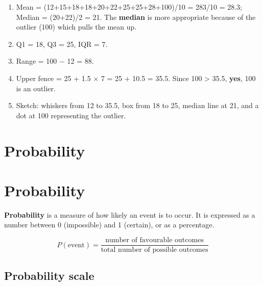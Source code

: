 \documentclass[
  11pt,
  a4paper,
  oneside,
  open=any]{scrbook}
\providecommand{\tightlist}{%
  \setlength{\itemsep}{0pt}\setlength{\parskip}{0pt}}
\begin{document}
\begin{tcolorbox}[enhanced jigsaw, breakable, leftrule=.75mm, bottomtitle=1mm, bottomrule=.15mm, titlerule=0mm, left=2mm, opacitybacktitle=0.6, coltitle=black, colbacktitle=quarto-callout-note-color!10!white, rightrule=.15mm, title=\textcolor{quarto-callout-note-color}{\faInfo}\hspace{0.5em}{Answers}, toptitle=1mm, arc=.35mm, colback=white, toprule=.15mm, colframe=quarto-callout-note-color-frame, opacityback=0]

\begin{enumerate}
\def\labelenumi{\arabic{enumi}.}
\tightlist
\item
  Mean = (12+15+18+18+20+22+25+25+28+100)/10 = 283/10 = 28.3; Median =
  (20+22)/2 = 21. The \textbf{median} is more appropriate because of the
  outlier (100) which pulls the mean up.
\item
  Q1 = 18, Q3 = 25, IQR = 7.
\item
  Range = 100 − 12 = 88.
\item
  Upper fence = 25 + 1.5 × 7 = 25 + 10.5 = 35.5. Since 100
  \textgreater{} 35.5, \textbf{yes}, 100 is an outlier.
\item
  Sketch: whiskers from 12 to 35.5, box from 18 to 25, median line at
  21, and a dot at 100 representing the outlier.
\end{enumerate}

\end{tcolorbox}


\chapter{Probability}\label{probability}


\chapter{Probability}\label{sec-probability}

\textbf{Probability} is a measure of how likely an event is to occur. It
is expressed as a number between 0 (impossible) and 1 (certain), or as a
percentage.

\[P(\text{event}) = \frac{\text{number of favourable outcomes}}{\text{total number of possible outcomes}}\]

\section{Probability scale}\label{probability-scale}
\end{document}

